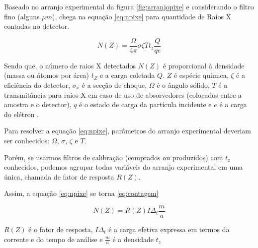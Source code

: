 Baseado no arranjo experimental da figura \ref{fig:arranjopixe} e
considerando o filtro fino (alguns $\mu m$),
\cite{tabacniks2000} chega na equação \ref{eq:npixe} para quantidade de Raios X
contadas no detector. 

\begin{equation}
  \label{eq:npixe}
  N(Z) = \frac{\Omega}{4\pi} \sigma \zeta T t_z \frac{Q}{qe}
\end{equation}

Sendo que, o número de raios X detectados $N(Z)$ é proporcional à 
densidade (massa ou átomos por área) $t_Z$ e a carga coletada $Q$.
$Z$ é espécie química, $\zeta$ é a eficiência do detector, 
$\sigma_x$ é a secção de choque, $\Omega$ é o ângulo sólido, 
$T$ é a transmitância para raios-X em caso de uso de absorvedores 
(colocados entre a amostra e o detector), $q$ é o estado de carga da 
partícula incidente e $e$ é a carga do elétron \cite{tabacniks2000}.

Para resolver a equação \ref{eq:npixe}, parâmetros do arranjo experimental
deveriam ser conhecidos: $\Omega$, $\sigma$, $\zeta$ e $T$. 

Porém, se usarmos filtros de calibração (comprados ou produzidos) 
com $t_z$ conhecidos, podemos agrupar todas variáveis
do arranjo experimental em uma única, chamada de fator de resposta $R(Z)$.

Assim, a equação \ref{eq:npixe} se torna \ref{eq:contagem}

\begin{equation}
  \label{eq:contagem}
  N(Z) = R(Z) I\Delta_t \frac{m}{a}
\end{equation}

$R(Z)$ é o fator de resposta, $I\Delta_t$ é a carga efetiva expressa
em termos da corrente e do tempo de análise e $\frac{m}{a}$ é a 
densidade $t_z$







